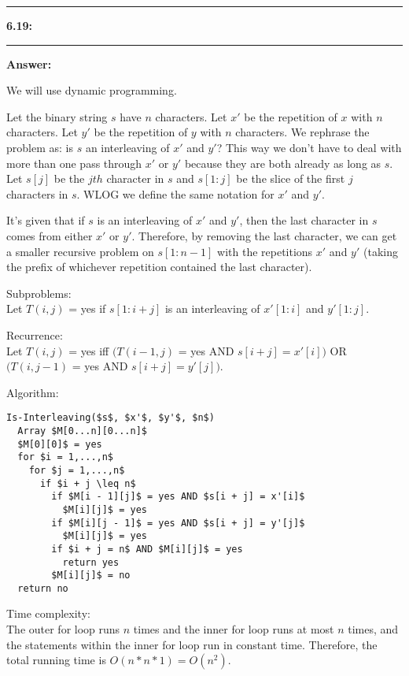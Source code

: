 \documentclass[11pt]{article}
\newcommand\question[2]{\vspace{.25in}\hrule\textbf{#1: #2}\vspace{.5em}\hrule\vspace{.10in}}
\newcommand\answer{\vspace{.10in}\textbf{Answer: }}
\begin{document}
\raggedright
\newcommand\NAME{Stewart Dulaney}  %
\newcommand\SID{904-064-791}     %
\newcommand\HWNUM{6}              %

\question{6.19}{}

\answer

We will use dynamic programming.\newline

Let the binary string $s$ have $n$ characters. Let $x'$ be the repetition of $x$ with $n$ characters. Let $y'$ be the repetition of $y$ with $n$ characters. We rephrase the problem as: is $s$ an interleaving of $x'$ and $y'$? This way we don't have to deal with more than one pass through $x'$ or $y'$ because they are both already as long as $s$. Let $s[j]$ be the $jth$ character in $s$ and $s[1 : j]$ be the slice of the first $j$ characters in $s$. WLOG we define the same notation for $x'$ and $y'$.\newline

It's given that if $s$ is an interleaving of $x'$ and $y'$, then the last character in $s$ comes from either $x'$ or $y'$. Therefore, by removing the last character, we can get a smaller recursive problem on $s[1 : n - 1]$ with the repetitions $x'$ and $y'$ (taking the prefix of whichever repetition contained the last character).

Subproblems:\\

Let $T(i, j)$ = yes if $s[1 : i + j]$ is an interleaving of $x'[1 : i]$ and $y'[1 : j]$.\newline

Recurrence:\\

Let $T(i, j)$ = yes iff $(T(i - 1, j)$ = yes AND $s[i + j] = x'[i])$ OR $(T(i, j - 1)$ = yes AND $s[i + j] = y'[j])$.\newline

Algorithm:\\

\begin{lstlisting}
Is-Interleaving($s$, $x'$, $y'$, $n$)
  Array $M[0...n][0...n]$
  $M[0][0]$ = yes
  for $i = 1,...,n$
    for $j = 1,...,n$
      if $i + j \leq n$
        if $M[i - 1][j]$ = yes AND $s[i + j] = x'[i]$
          $M[i][j]$ = yes
        if $M[i][j - 1]$ = yes AND $s[i + j] = y'[j]$
          $M[i][j]$ = yes
        if $i + j = n$ AND $M[i][j]$ = yes
          return yes
        $M[i][j]$ = no
  return no
\end{lstlisting}

Time complexity:\\

The outer for loop runs $n$ times and the inner for loop runs at most $n$ times, and the statements within the inner for loop run in constant time. Therefore, the total running time is $O(n * n * 1) = O(n^2)$.

\clearpage
\end{document}
